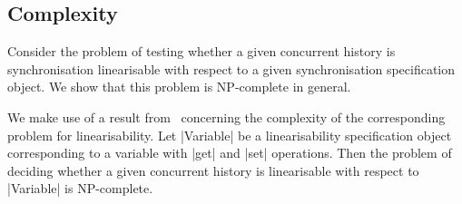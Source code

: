






\subsection{Complexity}
\label{sec:NP-complete}

Consider the problem of testing whether a given concurrent history is
synchronisation linearisable with respect to a given synchronisation
specification object.  We show that this problem is NP-complete in general.


We make use of a result from~\cite{gibbons-korach} concerning the complexity
of the corresponding problem for linearisability.  Let |Variable| be a
linearisability specification object corresponding to a variable with |get|
and |set| operations.  Then the problem of deciding whether a given concurrent
history is linearisable with respect to |Variable| is NP-complete.

